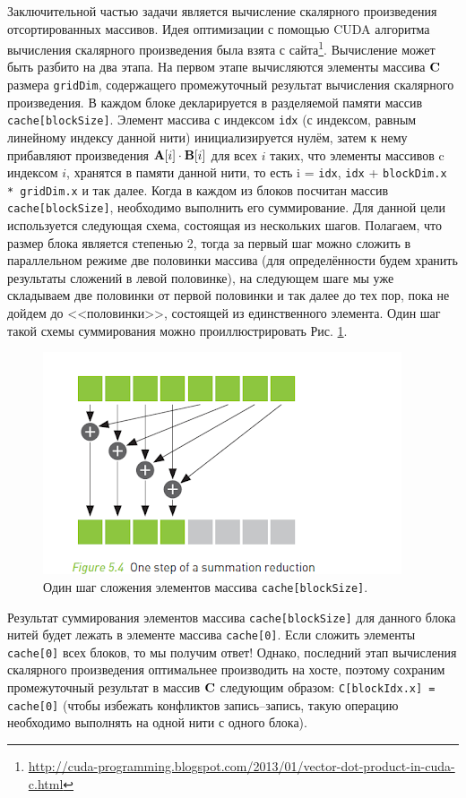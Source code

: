 Заключительной частью задачи является вычисление скалярного произведения отсортированных массивов. Идея оптимизации с помощью CUDA алгоритма вычисления скалярного произведения была взята с сайта\footnote{\url{http://cuda-programming.blogspot.com/2013/01/vector-dot-product-in-cuda-c.html}}. Вычисление может быть разбито на два этапа. На первом этапе вычисляются элементы массива $\vb{C}$ размера \texttt{gridDim}, содержащего промежуточный результат вычисления скалярного произведения. В каждом блоке декларируется в разделяемой памяти массив \texttt{cache[blockSize]}. Элемент массива с индексом \texttt{idx} (с индексом, равным линейному индексу данной нити) инициализируется нулём, затем к нему прибавляют произведения $\vb{A}[i]\cdot\vb{B}[i]$ для всех $i$ таких, что элементы массивов c индексом $i$, хранятся в памяти данной нити, то есть i = \texttt{idx}, \texttt{idx} + \texttt{blockDim.x * gridDim.x} и так далее. Когда в каждом из блоков посчитан массив \texttt{cache[blockSize]}, необходимо выполнить его суммирование. Для данной цели используется следующая схема, состоящая из нескольких шагов. Полагаем, что размер блока является степенью 2, тогда за первый шаг можно сложить в параллельном режиме две половинки массива (для определённости будем хранить результаты сложений в левой половинке), на следующем шаге мы уже складываем две половинки от первой половинки и так далее до тех пор, пока не дойдем до <<половинки>>, состоящей из единственного элемента. Один шаг такой схемы суммирования можно проиллюстрировать Рис. \ref{fig:sumReduction}.
\begin{figure}
    \centering
    \includegraphics[scale=0.75]{fig/reduction+vector+dot+product.png}
    \caption{Один шаг сложения элементов массива \texttt{cache[blockSize]}.}
    \label{fig:sumReduction}
\end{figure}
Результат суммирования элементов массива \texttt{cache[blockSize]} для данного блока нитей будет лежать в элементе массива \texttt{cache[0]}. Если сложить элементы \texttt{cache[0]} всех блоков, то мы получим ответ! Однако, последний этап вычисления скалярного произведения оптимальнее производить на хосте, поэтому сохраним промежуточный результат в массив $\vb{C}$ следующим образом: \texttt{C[blockIdx.x] = cache[0]} (чтобы избежать конфликтов запись--запись, такую операцию необходимо выполнять на одной нити с одного блока).

